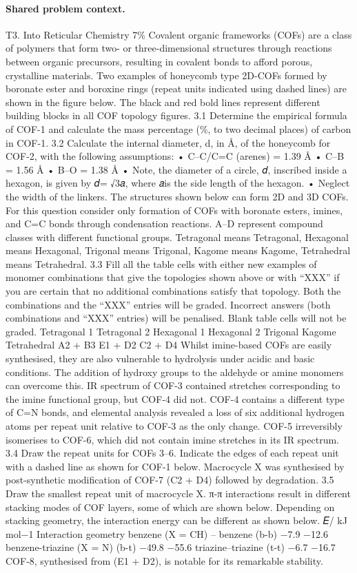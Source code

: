 \paragraph{Shared problem context.}
T3. Into Reticular Chemistry 7\% Covalent organic frameworks (COFs) are a class of polymers that form two- or three-dimensional structures through reactions between organic precursors, resulting in covalent bonds to afford porous, crystalline materials. Two examples of honeycomb type 2D-COFs formed by boronate ester and boroxine rings (repeat units indicated using dashed lines) are shown in the figure below. The black and red bold lines represent different building blocks in all COF topology figures. 3.1 Determine the empirical formula of COF-1 and calculate the mass percentage (\%, to two decimal places) of carbon in COF-1. 3.2 Calculate the internal diameter, d, in Å, of the honeycomb for COF-2, with the following assumptions: • C–C/C=C (arenes) = 1.39 Å • C–B = 1.56 Å • B–O = 1.38 Å • Note, the diameter of a circle, 𝑑, inscribed inside a hexagon, is given by 𝑑= √3𝑎, where 𝑎is the side length of the hexagon. • Neglect the width of the linkers. The structures shown below can form 2D and 3D COFs. For this question consider only formation of COFs with boronate esters, imines, and C=C bonds through condensation reactions. A–D represent compound classes with different functional groups. Tetragonal means Tetragonal, Hexagonal means Hexagonal, Trigonal means Trigonal, Kagome means Kagome, Tetrahedral means Tetrahedral. 3.3 Fill all the table cells with either new examples of monomer combinations that give the topologies shown above or with “XXX” if you are certain that no additional combinations satisfy that topology. Both the combinations and the “XXX” entries will be graded. Incorrect answers (both combinations and “XXX” entries) will be penalised. Blank table cells will not be graded. Tetragonal 1 Tetragonal 2 Hexagonal 1 Hexagonal 2 Trigonal Kagome Tetrahedral A2 + B3 E1 + D2 C2 + D4 Whilst imine-based COFs are easily synthesised, they are also vulnerable to hydrolysis under acidic and basic conditions. The addition of hydroxy groups to the aldehyde or amine monomers can overcome this. IR spectrum of COF-3 contained stretches corresponding to the imine functional group, but COF-4 did not. COF-4 contains a different type of C=N bonds, and elemental analysis revealed a loss of six additional hydrogen atoms per repeat unit relative to COF-3 as the only change. COF-5 irreversibly isomerises to COF-6, which did not contain imine stretches in its IR spectrum. 3.4 Draw the repeat units for COFs 3–6. Indicate the edges of each repeat unit with a dashed line as shown for COF-1 below. Macrocycle X was synthesised by post-synthetic modification of COF-7 (C2 + D4) followed by degradation. 3.5 Draw the smallest repeat unit of macrocycle X. π-π interactions result in different stacking modes of COF layers, some of which are shown below. Depending on stacking geometry, the interaction energy can be different as shown below. 𝐸/ kJ mol−1 Interaction geometry benzene (X = CH) – benzene (b-b) −7.9 −12.6 benzene-triazine (X = N) (b-t) −49.8 −55.6 triazine–triazine (t-t) −6.7 −16.7 COF-8, synthesised from (E1 + D2), is notable for its remarkable stability. 